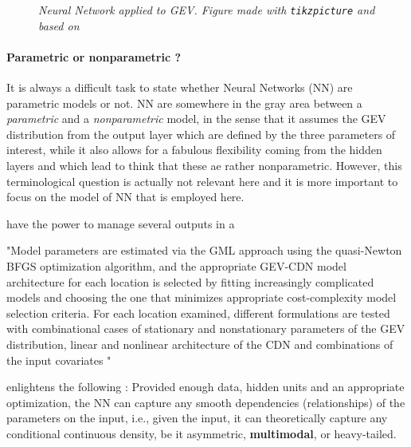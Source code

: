 \begin{figure}[!htb]
\begin{center}
{{
		}
	}
	\vspace{-2.5mm}
	\caption{\emph{ Neural Network applied to GEV. Figure made with \texttt{tikzpicture} and based on  \textcolor{JungleGreen}{\cite{cannon_flexible_2010}}} }
	\end{center}
\end{figure}

\paragraph*{Parametric or nonparametric ?}
It is always a difficult task to state whether Neural Networks (NN) are parametric models or not. NN  are somewhere in the gray area between a \emph{parametric} and a \emph{nonparametric} model, in the sense that it assumes the GEV distribution from the output layer which are defined by the three parameters of interest, while it also allows for a fabulous flexibility coming from the hidden layers and which lead to think that these ae rather nonparametric.
However, this terminological question is actually not relevant here and it is more important to focus on the model of NN that is employed here.

have the power to manage several outputs in a 

"Model parameters are estimated via the GML approach using the
quasi-Newton BFGS optimization algorithm, and the appropriate GEV-CDN model architecture for
each location is selected by fitting increasingly complicated models and choosing the one that
minimizes appropriate cost-complexity model selection criteria. For each location examined, different
formulations are tested with combinational cases of stationary and nonstationary parameters of the
GEV distribution, linear and nonlinear architecture of the CDN and combinations of the input covariates "


\cite{carreau_hybrid_2009} enlightens the following : Provided enough data, hidden units and an appropriate optimization, the NN can capture any smooth dependencies (relationships) of the parameters on the input, i.e., given the input, it can theoretically capture any conditional continuous density, be it asymmetric, \textbf{multimodal}, or heavy-tailed.

